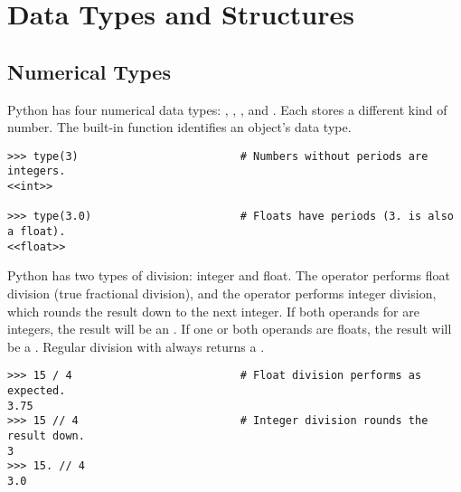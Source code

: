 \section*{Data Types and Structures} %

\subsection*{Numerical Types} %

Python has four numerical data types: , ,
, and .
Each stores a different kind of number.
The built-in function  identifies an object's data type.

\begin{lstlisting}
>>> type(3)                         # Numbers without periods are integers.
<<int>>

>>> type(3.0)                       # Floats have periods (3. is also a float).
<<float>>
\end{lstlisting}

Python has two types of division: integer and float.
The \li{/} operator performs float division (true fractional division), and the \li{//} operator performs integer division, which rounds the result down to the next integer.
If both operands for \li{//} are integers, the result will be an .
If one or both operands are floats, the result will be a .
Regular division with \li{/} always returns a .

\begin{lstlisting}
>>> 15 / 4                          # Float division performs as expected.
3.75
>>> 15 // 4                         # Integer division rounds the result down.
3
>>> 15. // 4
3.0
\end{lstlisting}

\begin{comment}
\begin{warn} %
In previous versions of Python, using \li{/} with two integers performed integer division, even in cases where the division was not even.
This can result in some incredibly subtle and frustrating errors.
If you are using Python 2.7, always include a \li{.} on the operands or cast at least one as a float when you want float division.
\begin{lstlisting}
# PYTHON 2.7
>>> 15 / 4                          # The answer should be 3.75, but the
3                                   # interpreter does integer division!

>>> 15. / float(4)                  # 15. and float(4) are both floats, so
3.75                                # the interpreter does float division.
\end{lstlisting}
Alternatively, including the following line at the top of the file redefines the \li{/} and \li{//} operators so they are handled the same way as in Python 3.
\begin{lstlisting}
>>> from __future__ import division
\end{lstlisting}
\end{warn}
\end{comment}

